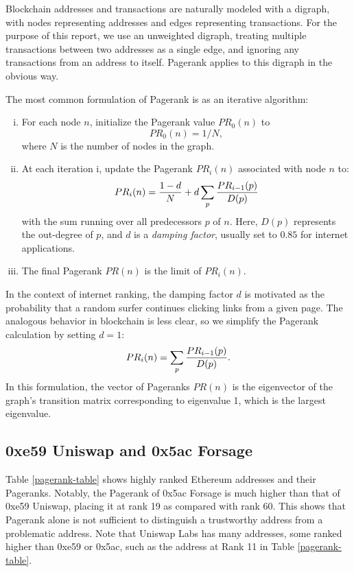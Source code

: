 \documentclass[a4paper]{article}
\begin{document}
Blockchain addresses and transactions are naturally modeled with a digraph, with nodes representing addresses and edges representing transactions.  For the purpose of this report, we use an unweighted digraph, treating multiple transactions between two addresses as a single edge, and ignoring any transactions from an address to itself.  Pagerank applies to this digraph in the obvious way.

The most common formulation of Pagerank is as an iterative algorithm:   
\begin{enumerate}[i.]
\item For each node $n$, initialize the Pagerank value $PR_0(n)$ to $$PR_0(n)=1/N,$$ where $N$ is the number of nodes in the graph.
\item At each iteration i, update the Pagerank $PR_i(n)$ associated with node $n$ to:
$$PR_i(n)={{1-d}\over{N} } + d \sum_p  {{PR_{i-1}(p)}\over{D(p)}}$$
with the sum running over all predecessors $p$ of $n$.  Here, $D(p)$ represents the out-degree of $p$, and $d$ is a {\it damping factor}, usually set to $0.85$ for internet applications.  
\item The final Pagerank $PR(n)$ is the limit of $PR_i(n)$.
\end{enumerate}
In the context of internet ranking, the damping factor $d$ is motivated as the probability that a random surfer continues clicking links from a given page.  The analogous behavior in blockchain is less clear, so we simplify the Pagerank calculation by setting $d=1$:
$$PR_i(n)=\sum_p  {{PR_{i-1}(p)}\over{D(p)}}.$$
In this formulation, the vector of Pageranks $PR(n)$ is the eigenvector of the graph's transition matrix corresponding to eigenvalue 1, which is the largest eigenvalue.

\subsection{0xe59 Uniswap and 0x5ac Forsage}

Table \ref{pagerank-table} shows highly ranked Ethereum addresses and their Pageranks.  Notably, the Pagerank of 0x5ac Forsage is much higher than that of 0xe59 Uniswap, placing it at rank 19 as compared with rank 60.  This shows that Pagerank alone is not sufficient to distinguish a trustworthy address from a problematic address.  Note that Uniswap Labs has many addresses, some ranked higher than 0xe59 or 0x5ac, such as the address at Rank 11 in Table \ref{pagerank-table}.  
\end{document}
